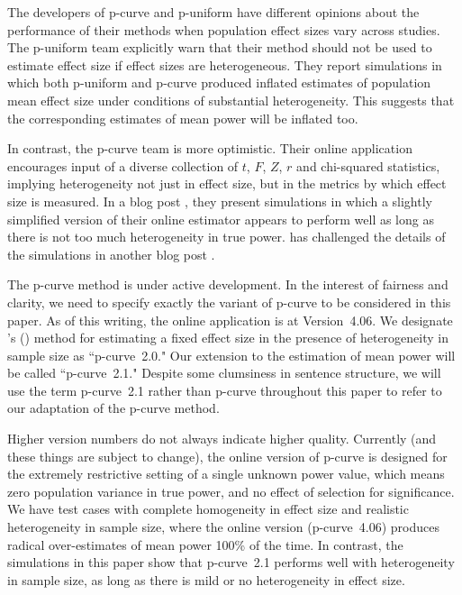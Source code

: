 \documentclass[jou]{apa6} %
\begin{document}
The developers of p-curve and p-uniform have different opinions about the performance of their methods when population effect sizes vary across studies. The p-uniform team \parencite{vanAertEtAl2016} explicitly warn that their method should not be used to estimate effect size if effect sizes are heterogeneous. They report simulations in which both p-uniform and p-curve produced inflated estimates of population mean effect size under conditions of substantial heterogeneity. This suggests that the corresponding estimates of mean power will be inflated too. 

In contrast, the p-curve team is more optimistic. Their online application \parencite{pcurveonline} encourages input of a diverse collection of $t$, $F$, $Z$, $r$ and chi-squared statistics, implying heterogeneity not just in effect size, but in the metrics by which effect size is measured. In a blog post \parencite{justfine}, they present simulations in which a slightly simplified version of their online estimator appears to perform well as long as there is not too much heterogeneity in true power. \textcite{notfine} has challenged the details of the simulations in another blog post .

The p-curve method is under active development. In the interest of fairness and clarity, we need to specify exactly the variant of p-curve to be considered in this paper. As of this writing, the online application is at Version~4.06. We designate
\citeauthor{SimonsohnEtAl2014b}'s (\citeyear{SimonsohnEtAl2014b}) method for estimating a fixed effect size in the presence of heterogeneity in sample size as ``p-curve~2.0." Our extension to the estimation of mean power will be called ``p-curve~2.1." Despite some clumsiness in sentence structure, we will use the term p-curve~2.1 rather than p-curve throughout this paper to refer to our adaptation of the p-curve method. 

Higher version numbers do not always indicate higher quality. Currently (and these things are subject to change), the online version of p-curve is designed for the extremely restrictive setting of a single unknown power value, which means zero population variance in true power, and no effect of selection for significance. We have test cases with complete homogeneity in effect size and realistic heterogeneity in sample size, where the online version (p-curve~4.06) produces radical over-estimates of mean power 100\% of the time.
In contrast, the simulations in this paper show that p-curve~2.1 performs well with heterogeneity in sample size, as long as there is mild or no heterogeneity in effect size. 
\end{document}
